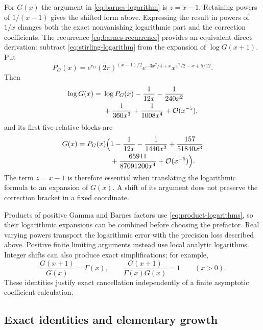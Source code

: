 For $G(x)$ the argument in \eqref{eq:barnes-logarithm} is
$z=x-1$. Retaining powers of $1/(x-1)$ gives the shifted form above.
Expressing the result in powers of $1/x$ changes both the exact
nonvanishing logarithmic part and the correction coefficients. The
recurrence \eqref{eq:barnes-recurrence} provides an equivalent direct
derivation: subtract \eqref{eq:stirling-logarithm} from the expansion
of $\log G(x+1)$. Put
\begin{equation}
 P_G(x)=e^{c_G}(2\pi)^{(x-1)/2}
        e^{-3x^2/4+x}x^{x^2/2-x+5/12}.
 \label{eq:barnes-prefactor}
\end{equation}
Then
\begin{equation}
\begin{aligned}
 \log G(x)={}&\log P_G(x)-\frac1{12x}-\frac1{240x^2}\\
            &+\frac1{360x^3}+\frac1{1008x^4}+\mathcal O(x^{-5}),
\end{aligned}
 \label{eq:barnes-unshifted-logarithm}
\end{equation}
and its first five relative blocks are
\begin{equation}
\begin{aligned}
 G(x)=P_G(x)\Bigl(&1-\frac1{12x}-\frac1{1440x^2}
              +\frac{157}{51840x^3}\\
              &+\frac{65911}{87091200x^4}+\mathcal O(x^{-5})\Bigr).
\end{aligned}
 \label{eq:barnes-five-blocks}
\end{equation}
The term $z=x-1$ is therefore essential when translating the
logarithmic formula to an expansion of $G(x)$. A shift of its argument
does not preserve the correction bracket in a fixed coordinate.

Products of positive Gamma and Barnes factors use
\eqref{eq:product-logarithms}, so their logarithmic expansions can
be combined before choosing the prefactor. Real varying powers
transport the logarithmic error with the precision loss described
above. Positive finite limiting arguments instead use local analytic
logarithms. Integer shifts can also produce exact simplifications;
for example,
\[
 \frac{G(x+1)}{G(x)}=\Gamma(x),\qquad
 \frac{G(x+1)}{\Gamma(x)G(x)}=1\qquad(x>0).
\]
These identities justify exact cancellation independently of a finite
asymptotic coefficient calculation.

\subsection{Exact identities and elementary growth}


